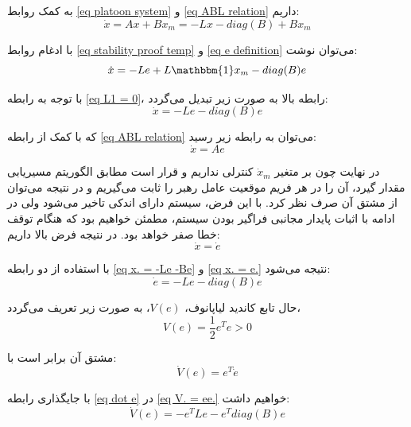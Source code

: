 به کمک روابط \ref{eq platoon system} و \ref{eq ABL relation} داریم:
\begin{equation}\label{eq stability proof temp}
\dot{x} = Ax + Bx_m = -Lx - diag(B) + Bx_m
\end{equation}

با ادغام روابط \ref{eq stability proof temp} و \ref{eq e definition} می‌توان نوشت:
\begin{equation}
\dot{x} = -Le + L\mathbbm{1}x_m - diag(B)e
\end{equation}

با توجه به رابطه \ref{eq L1 = 0}، رابطه بالا به صورت زیر تبدیل می‌گردد:
\begin{equation}\label{eq x. = -Le -Be}
\dot{x} = -Le - diag(B)e
\end{equation}

که با کمک از رابطه \ref{eq ABL relation} می‌توان به رابطه زیر رسید:
\begin{equation}
	\dot{x} = Ae
\end{equation}

در نهایت چون بر متغیر $\dot{x}_m$ کنترلی نداریم و قرار است مطابق الگوریتم مسیریابی مقدار گیرد، آن را در هر فریم موقعیت عامل رهبر را ثابت می‌گیریم و در نتیجه می‌توان از مشتق آن صرف نظر کرد. با این فرض، سیستم دارای اندکی تاخیر می‌شود ولی در ادامه با اثبات پایدار مجانبی فراگیر بودن سیستم، مطمئن خواهیم بود که هنگام توقف خطا صفر خواهد بود. در نتیجه فرض بالا داریم:
\begin{equation}\label{eq x. = e.}
	\dot{x} = \dot{e}
\end{equation}

با استفاده از دو رابطه \ref{eq x. = -Le -Be} و \ref{eq x. = e.} نتیجه می‌شود:
\begin{equation}\label{eq dot e}
	\dot{e} = -Le -diag(B)e
\end{equation}

حال تابع کاندید لیاپانوف، $V(e)$، به صورت زیر تعریف می‌گردد، 
\begin{equation}\label{eq V definition}
V(e) = \frac{1}{2}e^Te > 0
\end{equation}

مشتق آن برابر است با:
\begin{equation}\label{eq V. = ee.}
\dot{V}(e) = e^T\dot{e}
\end{equation}

با جایگذاری رابطه \ref{eq dot e} در \ref{eq V. = ee.} خواهیم داشت:
\begin{equation}\label{eq V.}
\dot{V}(e) = -e^TLe - e^Tdiag(B)e
\end{equation}

